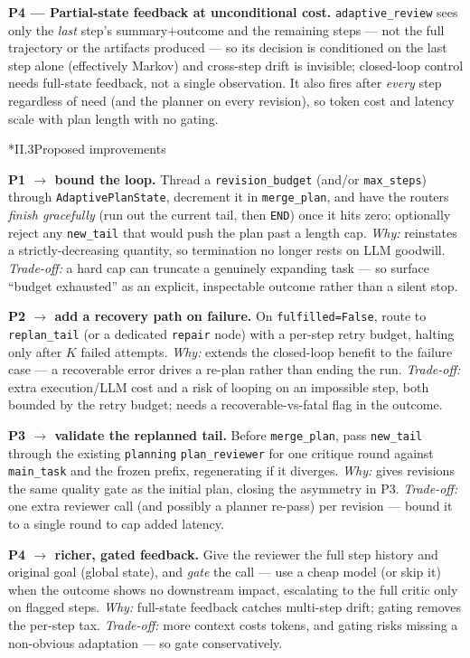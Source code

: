 \documentclass[11pt]{article}
\makeatletter
\newcommand{\code}[1]{\texttt{#1}}
\let\origsec\section
\renewcommand{\section}{\@ifstar{\tx@sec}{\origsec}}
\newcommand{\tx@sec}[1]{\phantomsection\origsec*{#1}\addcontentsline{toc}{subsection}{#1}}
\makeatother
\begin{document}
\textbf{P4 --- Partial-state feedback at unconditional cost.} \code{adaptive\_review} sees only the \emph{last} step's summary$+$outcome and
the remaining steps --- not the full trajectory or the artifacts produced --- so its decision is conditioned on the last step alone (effectively Markov)
and cross-step drift is invisible; closed-loop control needs full-state feedback, not a single observation. It also fires after
\emph{every} step regardless of need (and the planner on every revision), so token cost and latency scale with plan length with no
gating.

\section*{II.3\quad Proposed improvements}

\textbf{P1 $\to$ bound the loop.} Thread a \code{revision\_budget} (and/or \code{max\_steps}) through \code{AdaptivePlanState},
decrement it in \code{merge\_plan}, and have the routers \emph{finish gracefully} (run out the current tail, then \code{END}) once it
hits zero; optionally reject any \code{new\_tail} that would push the plan past a length cap. \emph{Why:} reinstates a
strictly-decreasing quantity, so termination no longer rests on LLM goodwill. \emph{Trade-off:} a hard cap can truncate a genuinely
expanding task --- so surface ``budget exhausted'' as an explicit, inspectable outcome rather than a silent stop.

\textbf{P2 $\to$ add a recovery path on failure.} On \code{fulfilled=False}, route to \code{replan\_tail} (or a dedicated
\code{repair} node) with a per-step retry budget, halting only after $K$ failed attempts. \emph{Why:} extends the closed-loop
benefit to the failure case --- a recoverable error drives a re-plan rather than ending the run.
\emph{Trade-off:} extra execution/LLM cost and a risk of looping on an impossible step, both bounded by the retry budget; needs a
recoverable-vs-fatal flag in the outcome.

\textbf{P3 $\to$ validate the replanned tail.} Before \code{merge\_plan}, pass \code{new\_tail} through the existing \code{planning}
\code{plan\_reviewer} for one critique round against \code{main\_task} and the frozen prefix, regenerating if it diverges.
\emph{Why:} gives revisions the same quality gate as the initial plan, closing the asymmetry in P3. \emph{Trade-off:} one extra
reviewer call (and possibly a planner re-pass) per revision --- bound it to a single round to cap added latency.

\textbf{P4 $\to$ richer, gated feedback.} Give the reviewer the full step history and original goal (global state), and \emph{gate}
the call --- use a cheap model (or skip it) when the outcome shows no downstream impact, escalating to the full critic only on
flagged steps. \emph{Why:} full-state feedback catches multi-step drift; gating removes the per-step tax. \emph{Trade-off:} more
context costs tokens, and gating risks missing a non-obvious adaptation --- so gate conservatively.
\end{document}
